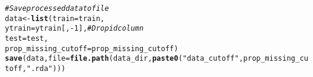\documentclass{article}\usepackage[]{graphicx}\usepackage[]{color}
\makeatletter
\newcommand{\hlnum}[1]{\textcolor[rgb]{0.686,0.059,0.569}{#1}}%
\newcommand{\hlstr}[1]{\textcolor[rgb]{0.192,0.494,0.8}{#1}}%
\newcommand{\hlcom}[1]{\textcolor[rgb]{0.678,0.584,0.686}{\textit{#1}}}%
\newcommand{\hlopt}[1]{\textcolor[rgb]{0,0,0}{#1}}%
\newcommand{\hlstd}[1]{\textcolor[rgb]{0.345,0.345,0.345}{#1}}%
\newcommand{\hlkwb}[1]{\textcolor[rgb]{0.69,0.353,0.396}{#1}}%
\newcommand{\hlkwc}[1]{\textcolor[rgb]{0.333,0.667,0.333}{#1}}%
\newcommand{\hlkwd}[1]{\textcolor[rgb]{0.737,0.353,0.396}{\textbf{#1}}}%
\newenvironment{kframe}{%
 \def\at@end@of@kframe{}%
 \ifinner\ifhmode%
  \def\at@end@of@kframe{\end{minipage}}%
  \begin{minipage}{\columnwidth}%
 \fi\fi%
 \def\FrameCommand##1{\hskip\@totalleftmargin \hskip-\fboxsep
 \colorbox{shadecolor}{##1}\hskip-\fboxsep
     \hskip-\linewidth \hskip-\@totalleftmargin \hskip\columnwidth}%
 \MakeFramed {\advance\hsize-\width
   \@totalleftmargin\z@ \linewidth\hsize
   \@setminipage}}%
 {\par\unskip\endMakeFramed%
 \at@end@of@kframe}
\newenvironment{knitrout}{}{} %
\makeatother
\begin{document}
\begin{knitrout}
\begin{kframe}
\begin{alltt}
\hlcom{# Save processed data to file}
\hlstd{data} \hlkwb{<-} \hlkwd{list}\hlstd{(}\hlkwc{train} \hlstd{= train,}
             \hlkwc{ytrain} \hlstd{= ytrain[,} \hlopt{-}\hlnum{1}\hlstd{],} \hlcom{# Drop id column }
             \hlkwc{test} \hlstd{= test,}
             \hlkwc{prop_missing_cutoff} \hlstd{= prop_missing_cutoff)}
\hlkwd{save}\hlstd{(data,} \hlkwc{file} \hlstd{=} \hlkwd{file.path}\hlstd{(data_dir,} \hlkwd{paste0}\hlstd{(}\hlstr{"data_cutoff"}\hlstd{, prop_missing_cutoff,} \hlstr{".rda"}\hlstd{)))}
\end{alltt}
\end{kframe}
\end{knitrout}
\end{document}
